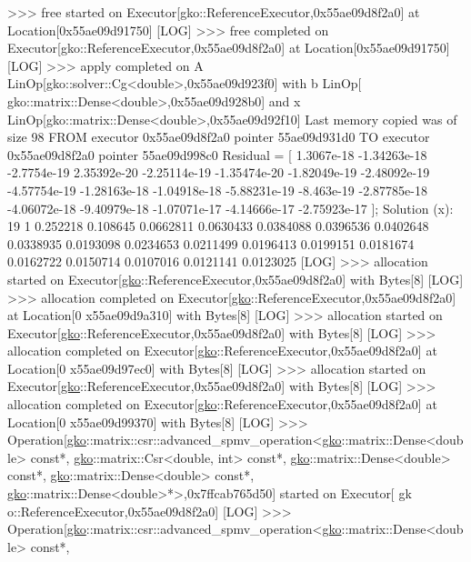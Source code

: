 \begin{DoxyCode}
[LOG] >>> free started on Executor[gko::ReferenceExecutor,0x55ae09d8f2a0] at Location[0x55ae09d91750]
[LOG] >>> free completed on Executor[gko::ReferenceExecutor,0x55ae09d8f2a0] at Location[0x55ae09d91750]
[LOG] >>> apply completed on A LinOp[gko::solver::Cg<double>,0x55ae09d923f0] with b LinOp[
      gko::matrix::Dense<double>,0x55ae09d928b0] and x LinOp[gko::matrix::Dense<double>,0x55ae09d92f10]
Last memory copied was of size 98 FROM executor 0x55ae09d8f2a0 pointer 55ae09d931d0 TO executor 
      0x55ae09d8f2a0 pointer 55ae09d998c0
Residual = [
    1.3067e-18
    -1.34263e-18
    -2.7754e-19
    2.35392e-20
    -2.25114e-19
    -1.35474e-20
    -1.82049e-19
    -2.48092e-19
    -4.57754e-19
    -1.28163e-18
    -1.04918e-18
    -5.88231e-19
    -8.463e-19
    -2.87785e-18
    -4.06072e-18
    -9.40979e-18
    -1.07071e-17
    -4.14666e-17
    -2.75923e-17
];
Solution (x):
19 1
0.252218
0.108645
0.0662811
0.0630433
0.0384088
0.0396536
0.0402648
0.0338935
0.0193098
0.0234653
0.0211499
0.0196413
0.0199151
0.0181674
0.0162722
0.0150714
0.0107016
0.0121141
0.0123025
[LOG] >>> allocation started on Executor[\hyperlink{namespacegko}{gko}::ReferenceExecutor,0x55ae09d8f2a0] with Bytes[8]
[LOG] >>> allocation completed on Executor[\hyperlink{namespacegko}{gko}::ReferenceExecutor,0x55ae09d8f2a0] at Location[0
      x55ae09d9a310] with Bytes[8]
[LOG] >>> allocation started on Executor[\hyperlink{namespacegko}{gko}::ReferenceExecutor,0x55ae09d8f2a0] with Bytes[8]
[LOG] >>> allocation completed on Executor[\hyperlink{namespacegko}{gko}::ReferenceExecutor,0x55ae09d8f2a0] at Location[0
      x55ae09d97ec0] with Bytes[8]
[LOG] >>> allocation started on Executor[\hyperlink{namespacegko}{gko}::ReferenceExecutor,0x55ae09d8f2a0] with Bytes[8]
[LOG] >>> allocation completed on Executor[\hyperlink{namespacegko}{gko}::ReferenceExecutor,0x55ae09d8f2a0] at Location[0
      x55ae09d99370] with Bytes[8]
[LOG] >>> Operation[\hyperlink{namespacegko}{gko}::matrix::csr::advanced\_spmv\_operation<\hyperlink{namespacegko}{gko}::matrix::Dense<double> const*, 
      \hyperlink{namespacegko}{gko}::matrix::Csr<double, int> const*, \hyperlink{namespacegko}{gko}::matrix::Dense<double> const*, 
      \hyperlink{namespacegko}{gko}::matrix::Dense<double> const*, \hyperlink{namespacegko}{gko}::matrix::Dense<double>*>,0x7ffcab765d50] started on Executor[
      gk
o::ReferenceExecutor,0x55ae09d8f2a0]
[LOG] >>> Operation[\hyperlink{namespacegko}{gko}::matrix::csr::advanced\_spmv\_operation<\hyperlink{namespacegko}{gko}::matrix::Dense<double> const*, 

\end{DoxyCode}
